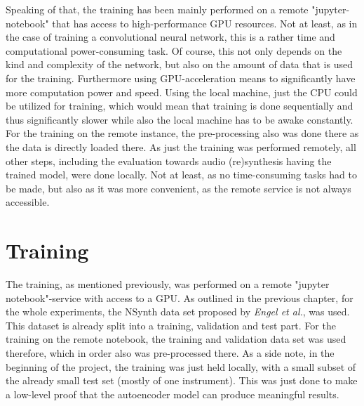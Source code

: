 Speaking of that, the training has been mainly performed on a remote "jupyter-notebook" that has access to high-performance GPU resources. Not at least, as in the case of training a convolutional neural network, this is a rather time and computational power-consuming task. Of course, this not only depends on the kind and complexity of the network, but also on the amount of data that is used for the training. Furthermore using GPU-acceleration means to significantly have more computation power and speed. Using the local machine, just the CPU could be utilized for training, which would mean that training is done sequentially and thus significantly slower while also the local machine has to be awake constantly. For the training on the remote instance, the pre-processing also was done there as the data is directly loaded there. 
As just the training was performed remotely, all other steps, including the evaluation towards audio (re)synthesis having the trained model, were done locally. Not at least, as no time-consuming tasks had to be made, but also as it was more convenient, as the remote service is not always accessible.


\section{Training}
The training, as mentioned previously, was performed on a remote "jupyter notebook"-service with access to a GPU. As outlined in the previous chapter, for the whole experiments, the NSynth data set proposed by \textit{Engel et al.}\cite{Engel2017}, was used. This dataset is already split into a training, validation and test part. For the training on the remote notebook, the training and validation data set was used therefore, which in order also was pre-processed there. As a side note, in the beginning of the project, the training was just held locally, with a small subset of the already small test set (mostly of one instrument). This was just done to make a low-level proof that the autoencoder model can produce meaningful results. 

